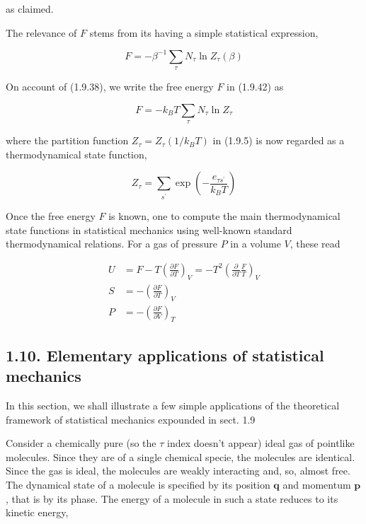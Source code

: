 \documentclass{article}
\begin{document}
as claimed.

The relevance of $F$ stems from its having a simple statistical expression,

\begin{equation*}
F=-\beta^{-1} \sum_{\tau} N_{\tau} \ln Z_{\tau}(\beta) \tag{1.9.42}
\end{equation*}


On account of (1.9.38), we write the free energy $F$ in (1.9.42) as

\begin{equation}
F=-k_{B} T \sum_{\tau} N_{\tau} \ln Z_{\tau} \tag{1.9.46}
\end{equation}

where the partition function $Z_{\tau}=Z_{\tau}\left(1 / k_{B} T\right)$ in (1.9.5) is now regarded as a thermodynamical state function,

\begin{equation*}
Z_{\tau}=\sum_{s^{\prime}} \exp \left(-\frac{e_{\tau s^{\prime}}}{k_{B} T}\right) \tag{1.9.47}
\end{equation*}


Once the free energy $F$ is known, one to compute the main thermodynamical state functions in statistical mechanics using well-known standard thermodynamical relations. For a gas of pressure $P$ in a volume $V$, these read
 
\begin{align*}
U & =F-T\left(\frac{\partial F}{\partial T}\right)_{V}=-T^{2}\left(\frac{\partial}{\partial T} \frac{F}{T}\right)_{V}  \tag{1.9.48}\\
S & =-\left(\frac{\partial F}{\partial T}\right)_{V}  \tag{1.9.49}\\
P & =-\left(\frac{\partial F}{\partial V}\right)_{T} \tag{1.9.50}
\end{align*}
 

\subsection*{1.10. Elementary applications of statistical mechanics}

In this section, we shall illustrate a few simple applications of the theoretical framework of statistical mechanics expounded in sect. 1.9

Consider a chemically pure (so the $\tau$ index doesn't appear) ideal gas of pointlike molecules. Since they are of a single chemical specie, the molecules are identical. Since the gas is ideal, the molecules are weakly interacting and, so, almost free. The dynamical state of a molecule is specified by its position $\boldsymbol{q}$ and momentum $\boldsymbol{p}$, that is by its phase. The energy of a molecule in such a state reduces to its kinetic energy,
\end{document}
